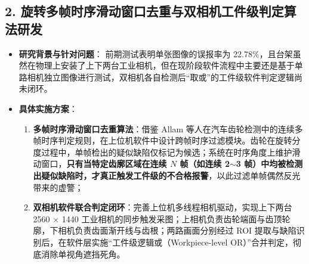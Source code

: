 
\subsection*{2. 旋转多帧时序滑动窗口去重与双相机工件级判定算法研发}
\begin{itemize}
    \item \textbf{研究背景与针对问题}：
    前期测试表明单张图像的误报率为 22.78\%，且台架虽然在物理上安装了上下两台工业相机，但在现阶段软件流程中主要还是基于单路相机独立图像进行测试，双相机各自检测后“取或”的工件级软件判定逻辑尚未闭环。
    \item \textbf{具体实施方案}：
    \begin{enumerate}
        \item \textbf{多帧时序滑动窗口去重算法}：借鉴 Allam 等人在汽车齿轮检测中的连续多帧时序判定规则，在上位机软件中设计跨帧时序过滤模块。齿轮在旋转分度过程中，单帧检出的疑似缺陷仅标记为候选；系统在时序角度上维护滑动窗口，\textbf{只有当特定齿廓区域在连续 $N$ 帧（如连续 2$\sim$3 帧）中均被检测出疑似缺陷时，才真正触发工件级的不合格报警}，以此过滤单帧偶然反光带来的虚警；
        \item \textbf{双相机软件联合判定闭环}：完善上位机多线程相机驱动，实现上下两台 2560 $\times$ 1440 工业相机的同步触发采图；上相机负责齿轮端面与齿顶轮廓，下相机负责齿面渐开线与齿根；两路画面分别经过 ROI 提取与缺陷识别后，在软件层实施“工件级逻辑或（Workpiece-level OR）”合并判定，彻底消除单视角遮挡死角。
    \end{enumerate}
\end{itemize}


